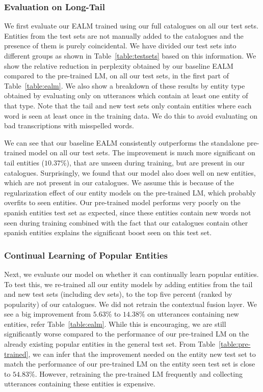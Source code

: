 \documentclass{article}
\begin{document}
\subsubsection{Evaluation on Long-Tail}
We first evaluate our EALM trained using our full catalogues on all our test sets. Entities from the test sets are not manually added to the catalogues and the presence of them is purely coincidental. We have divided our test sets into different groups as shown in Table~\ref{table:testsets} based on this information. We show the relative reduction in perplexity obtained by our baseline EALM compared to the pre-trained LM, on all our test sets, in the first part of Table~\ref{table:ealm}. We also show a breakdown of these results by entity type obtained by evaluating only on utterances which contain at least one entity of that type. Note that the tail and new test sets only contain entities where each word is seen at least once in the training data. We do this to avoid evaluating on bad transcriptions with misspelled words.

We can see that our baseline EALM consistently outperforms the standalone pre-trained model on all our test sets. The improvement is much more significant on tail entities ($10.37\%$), that are unseen during training, but are present in our catalogues. Surprisingly, we found that our model also does well on new entities, which are not present in our catalogues. We assume this is because of the regularization effect of our entity models on the pre-trained LM, which probably overfits to seen entities. Our pre-trained model performs very poorly on the spanish entities test set as expected, since these entities contain new words not seen during training combined with the fact that our catalogues contain other spanish entities explains the significant boost seen on this test set.

\subsubsection{Continual Learning of Popular Entities}
Next, we evaluate our model on whether it can continually learn popular entities. To test this, we re-trained all our entity models by adding entities from the tail and new test sets (including dev sets), to the top five percent (ranked by popularity) of our catalogues. We did not retrain the contextual fusion layer. We see a big improvement from $5.63\%$ to $14.38\%$ on utterances containing new entities, refer Table~\ref{table:ealm}. While this is encouraging, we are still significantly worse compared to the performance of our pre-trained LM on the already existing popular entities in the general test set. From Table~\ref{table:pre-trained}, we can infer that the improvement needed on the entity new test set to match the performance of our pre-trained LM on the entity seen test set is close to $54.83\%$. However, retraining the pre-trained LM frequently and collecting utterances containing these entities is expensive.
\end{document}
